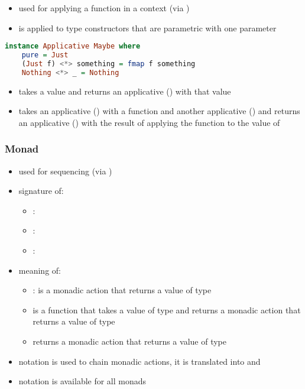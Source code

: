 \documentclass[a4paper,landscape,10pt]{article}
\begin{document}
\begin{multicols*}{2}
  \begin{itemize}
    \item used for applying a function in a context (via \ihaskell{<*>})
    \item is applied to type constructors that are parametric with one parameter
  \end{itemize}

  \begin{lstlisting}[language=Haskell]
instance Applicative Maybe where
    pure = Just
    (Just f) <*> something = fmap f something
    Nothing <*> _ = Nothing
\end{lstlisting}

  \begin{itemize}
    \item {} takes a value and returns an applicative () with that value
    \item \ihaskell{<*>} takes an applicative () with a function and another applicative () and returns an applicative () with the result of applying the function to the value of 
  \end{itemize}

  \subsubsection{Monad}

  \begin{itemize}
    \item used for sequencing (via \ihaskell{>>=})
    \item signature of:
          \begin{itemize}
            \item \ihaskell{>>=}: 
            \item \ihaskell{>>}: 
            \item {}: 
          \end{itemize}
    \item meaning of:
          \begin{itemize}
            \item \ihaskell{>>=}:  is a monadic action that returns a value of type 
            \item {} is a function that takes a value of type  and returns a monadic action that returns a value of type 
            \item \ihaskell{>>=} returns a monadic action that returns a value of type 
          \end{itemize}
    \item {} notation is used to chain monadic actions, it is translated into \ihaskell{>>=} and \ihaskell{>>}
    \item {} notation is available for all monads
  \end{itemize}


\end{multicols*}
\end{document}
